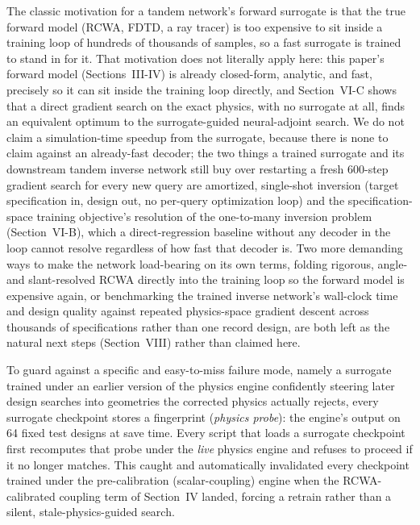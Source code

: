 \documentclass[10pt,twocolumn]{article}
\begin{document}
The classic motivation for a tandem network's forward surrogate is that the
true forward model (RCWA, FDTD, a ray tracer) is too expensive to sit
inside a training loop of hundreds of thousands of samples, so a fast
surrogate is trained to stand in for it. That motivation does not
literally apply here: this paper's forward model (Sections~III-IV) is
already closed-form, analytic, and fast, precisely so it can sit inside the
training loop directly, and Section~VI-C shows that a direct gradient
search on the exact physics, with no surrogate at all, finds an equivalent
optimum to the surrogate-guided neural-adjoint search. We do not claim a
simulation-time speedup from the surrogate, because there is none to claim
against an already-fast decoder; the two things a trained surrogate and its
downstream tandem inverse network still buy over restarting a fresh
600-step gradient search for every new query are amortized, single-shot
inversion (target specification in, design out, no per-query optimization
loop) and the specification-space training objective's resolution of the
one-to-many inversion problem (Section~VI-B), which a direct-regression
baseline without any decoder in the loop cannot resolve regardless of how
fast that decoder is. Two more demanding ways to make the network load-bearing
on its own terms, folding rigorous, angle- and slant-resolved RCWA directly
into the training loop so the forward model is expensive again, or
benchmarking the trained inverse network's wall-clock time and design
quality against repeated physics-space gradient descent across thousands of
specifications rather than one record design, are both left as the natural
next steps (Section~VIII) rather than claimed here.

To guard against a specific and easy-to-miss failure mode, namely a
surrogate trained under an earlier version of the physics engine
confidently steering later design searches into geometries the corrected
physics actually rejects, every surrogate checkpoint stores a
fingerprint (\emph{physics probe}): the engine's output on 64 fixed test
designs at save time. Every script that loads a surrogate checkpoint first
recomputes that probe under the \emph{live} physics engine and refuses to
proceed if it no longer matches. This caught and automatically invalidated
every checkpoint trained under the pre-calibration (scalar-coupling)
engine when the RCWA-calibrated coupling term of Section~IV landed, forcing
a retrain rather than a silent, stale-physics-guided search.
\end{document}

